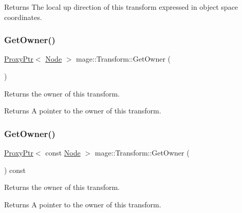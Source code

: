 \begin{DoxyReturn}{Returns}
The local up direction of this transform expressed in object space coordinates. 
\end{DoxyReturn}
\hypertarget{classmage_1_1_transform_afc6a2f11abb7d13de831f2c78470dc04}{}\label{classmage_1_1_transform_afc6a2f11abb7d13de831f2c78470dc04} 
\subsubsection{\texorpdfstring{Get\+Owner()}{GetOwner()}\hspace{0.1cm}{\footnotesize\ttfamily [1/2]}}
{\footnotesize\ttfamily \hyperlink{classmage_1_1_proxy_ptr}{Proxy\+Ptr}$<$ \hyperlink{classmage_1_1_node}{Node} $>$ mage\+::\+Transform\+::\+Get\+Owner (\begin{DoxyParamCaption}{ }\end{DoxyParamCaption})\hspace{0.3cm}{\ttfamily [noexcept]}}

Returns the owner of this transform.

\begin{DoxyReturn}{Returns}
A pointer to the owner of this transform. 
\end{DoxyReturn}
\hypertarget{classmage_1_1_transform_a90132f710e641238f3a988ffdbcc1a8b}{}\label{classmage_1_1_transform_a90132f710e641238f3a988ffdbcc1a8b} 
\subsubsection{\texorpdfstring{Get\+Owner()}{GetOwner()}\hspace{0.1cm}{\footnotesize\ttfamily [2/2]}}
{\footnotesize\ttfamily \hyperlink{classmage_1_1_proxy_ptr}{Proxy\+Ptr}$<$ const \hyperlink{classmage_1_1_node}{Node} $>$ mage\+::\+Transform\+::\+Get\+Owner (\begin{DoxyParamCaption}{ }\end{DoxyParamCaption}) const\hspace{0.3cm}{\ttfamily [noexcept]}}

Returns the owner of this transform.

\begin{DoxyReturn}{Returns}
A pointer to the owner of this transform. 
\end{DoxyReturn}
\hypertarget{classmage_1_1_transform_a0a99aa4625d2bfea0d0484f23bde0d65}{}\label{classmage_1_1_transform_a0a99aa4625d2bfea0d0484f23bde0d65} 
